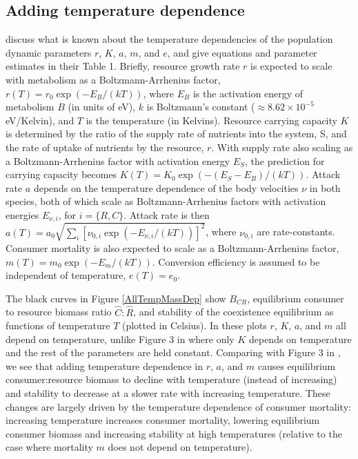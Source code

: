 \documentclass[11pt]{article}
\begin{document}
\subsection*{Adding temperature dependence}

\cite{Gilbert2014} discuss what is known about the temperature dependencies of the population dynamic parameters $r$, $K$, $a$, $m$, and $e$, and give equations and parameter estimates in their Table 1.
Briefly, resource growth rate $r$ is expected to scale with metabolism as a Boltzmann-Arrhenius factor, $r(T) = r_0 \exp(-E_B/(kT))$, where $E_B$ is the activation energy of metabolism $B$ (in units of eV), $k$ is Boltzmann's constant ($\approx 8.62 \times 10^{-5}$ eV/Kelvin), and $T$ is the temperature (in Kelvins).
Resource carrying capacity $K$ is determined by the ratio of the supply rate of nutrients into the system, S, and the rate of uptake of nutrients by the resource, $r$.
With supply rate also scaling as a Boltzmann-Arrhenius factor with activation energy $E_S$, the prediction for carrying capacity becomes  $K(T) = K_0 \exp(-(E_S - E_B)/(kT))$. 
Attack rate $a$ depends on the temperature dependence of the body velocities $\nu$ in both species, both of which scale as Boltzmann-Arrhenius factors with activation energies $E_{\nu,i}$, for $i=\{R,C\}$.
Attack rate is then $a(T) = a_0 \sqrt{\sum_i \left[\nu_{0,i} \exp(-E_{\nu,i}/(kT)) \right]^2}$, where $\nu_{0,i}$ are rate-constants.
Consumer mortality is also expected to scale as a Boltzmann-Arrhenius factor, $m(T) = m_0 \exp(-E_m/(kT))$.
Conversion efficiency is assumed to be independent of temperature, $e(T) = e_0$.

The black curves in Figure \ref{AllTempMassDep} show $B_{CR}$, equilibrium consumer to resource biomass ratio $\hat{C}:\hat{R}$, and stability of the coexistence equilibrium as functions of temperature $T$ (plotted in Celsius).
In these plots $r$, $K$, $a$, and $m$ all depend on temperature, unlike Figure 3 in \cite{Gilbert2014} where only $K$ depends on temperature and the rest of the parameters are held constant.
Comparing with Figure 3 in \cite{Gilbert2014}, we see that adding temperature dependence in $r$, $a$, and $m$ causes equilibrium consumer:resource biomass to decline with temperature (instead of increasing) and stability to decrease at a slower rate  with increasing temperature.
These changes are largely driven by the temperature dependence of consumer mortality: increasing temperature increases consumer mortality, lowering equilibrium consumer biomass and increasing stability at high temperatures (relative to the case where mortality $m$ does not depend on temperature).
%
%
\end{document}
